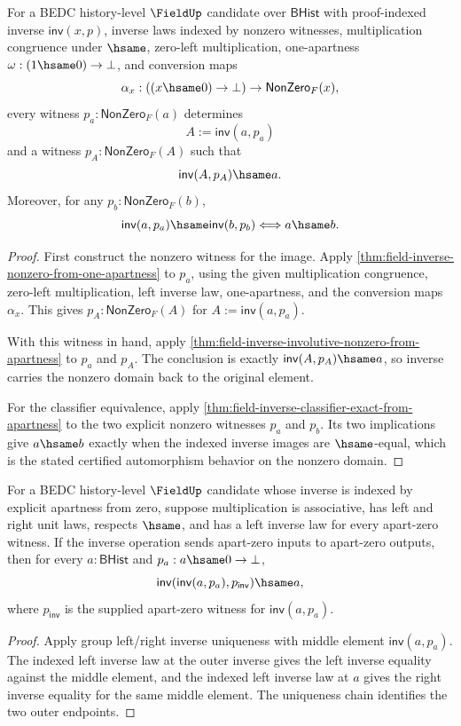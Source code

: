 \begin{theorem}
\label{thm:field-inverse-nonzero-domain-automorphism}
For a BEDC history-level $\FieldUp$ candidate over $\mathsf{BHist}$ with
proof-indexed inverse $\mathsf{inv}(x,p)$, inverse laws indexed by
nonzero witnesses, multiplication congruence under $\hsame$, zero-left
multiplication, one-apartness $\omega:(1\hsame 0)\to\bot$, and conversion
maps
$$
\alpha_x:((x\hsame 0)\to\bot)\to\mathsf{NonZero}_F(x),
$$
every witness $p_a:\mathsf{NonZero}_F(a)$ determines
$$
A:=\mathsf{inv}(a,p_a)
$$
and a witness $p_A:\mathsf{NonZero}_F(A)$ such that
$$
\mathsf{inv}(A,p_A)\hsame a.
$$
Moreover, for any $p_b:\mathsf{NonZero}_F(b)$,
$$
\mathsf{inv}(a,p_a)\hsame\mathsf{inv}(b,p_b)
\Longleftrightarrow a\hsame b.
$$
\end{theorem}
\begin{proof}
First construct the nonzero witness for the image. Apply
\autoref{thm:field-inverse-nonzero-from-one-apartness} to $p_a$, using the
given multiplication congruence, zero-left multiplication, left inverse law,
one-apartness, and the conversion maps $\alpha_x$. This gives
$p_A:\mathsf{NonZero}_F(A)$ for $A:=\mathsf{inv}(a,p_a)$.

With this witness in hand, apply
\autoref{thm:field-inverse-involutive-nonzero-from-apartness} to $p_a$ and $p_A$.
The conclusion is exactly $\mathsf{inv}(A,p_A)\hsame a$, so inverse carries
the nonzero domain back to the original element.

For the classifier equivalence, apply
\autoref{thm:field-inverse-classifier-exact-from-apartness} to the two
explicit nonzero witnesses $p_a$ and $p_b$. Its two implications give
$a\hsame b$ exactly when the indexed inverse images are $\hsame$-equal,
which is the stated certified automorphism behavior on the nonzero domain.
\end{proof}

\begin{theorem}
\label{thm:field-apartzero-inverse-involutive}
For a BEDC history-level $\FieldUp$ candidate whose inverse is indexed by
explicit apartness from zero, suppose multiplication is associative, has left
and right unit laws, respects $\hsame$, and has a left inverse law for every
apart-zero witness. If the inverse operation sends apart-zero inputs to
apart-zero outputs, then for every $a:\mathsf{BHist}$ and
$p_a:a\hsame0\to\bot$,
$$
\mathsf{inv}(\mathsf{inv}(a,p_a),p_{\mathsf{inv}})\hsame a,
$$
where $p_{\mathsf{inv}}$ is the supplied apart-zero witness for
$\mathsf{inv}(a,p_a)$.
\end{theorem}
\begin{proof}
Apply group left/right inverse uniqueness with middle element
$\mathsf{inv}(a,p_a)$. The indexed left inverse law at the outer inverse gives
the left inverse equality against the middle element, and the indexed left
inverse law at $a$ gives the right inverse equality for the same middle
element. The uniqueness chain identifies the two outer endpoints.
\end{proof}

